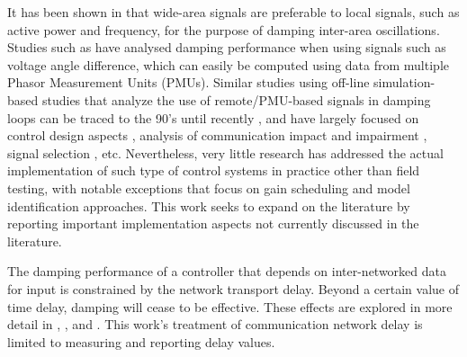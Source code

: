 \documentclass{ieeeaccess}
\begin{document}
It has been shown in \cite{Yuwa} that wide-area signals are preferable to local signals, such as active power and frequency\cite{localREMcomparison}, for the purpose of damping inter-area oscillations. Studies such as \cite{Yuwa} have analysed damping performance when using signals such as voltage angle difference, which can easily be computed using data from multiple Phasor Measurement Units (PMUs). Similar studies using off-line simulation-based studies that analyze the use of remote/PMU-based signals in damping loops can be traced to the 90's \cite{lit02} until recently \cite{lit01}, and have largely focused on control design aspects \cite{lit01}, analysis of communication impact and impairment \cite{lit05, lit03}, signal selection \cite{lit04}, etc. Nevertheless, very little research has addressed the actual implementation of such type of control systems in practice other than field testing, with notable exceptions \cite{lit06} that focus on gain scheduling and model identification approaches. This work seeks to expand on the literature by reporting important implementation aspects not currently discussed in the literature.

The damping performance of a controller that depends on inter-networked data for input is constrained by the network transport delay. Beyond a certain value of time delay, damping will cease to be effective. These effects are explored in more detail in \cite{China_paper}, \cite{Biplab}, \cite{lit03} and \cite{lit08}. This work's treatment of communication network delay is limited to measuring and reporting delay values.
\end{document}
